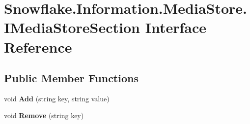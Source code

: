\hypertarget{interface_snowflake_1_1_information_1_1_media_store_1_1_i_media_store_section}{}\section{Snowflake.\+Information.\+Media\+Store.\+I\+Media\+Store\+Section Interface Reference}
\label{interface_snowflake_1_1_information_1_1_media_store_1_1_i_media_store_section}
\subsection*{Public Member Functions}
\begin{DoxyCompactItemize}
\item 
\hypertarget{interface_snowflake_1_1_information_1_1_media_store_1_1_i_media_store_section_af3dc1bd02ecb2d3338f94651480e4b30}{}void {\bfseries Add} (string key, string value)\label{interface_snowflake_1_1_information_1_1_media_store_1_1_i_media_store_section_af3dc1bd02ecb2d3338f94651480e4b30}

\item 
\hypertarget{interface_snowflake_1_1_information_1_1_media_store_1_1_i_media_store_section_aae9c8aa021f6477d289e1d572f7a6aeb}{}void {\bfseries Remove} (string key)\label{interface_snowflake_1_1_information_1_1_media_store_1_1_i_media_store_section_aae9c8aa021f6477d289e1d572f7a6aeb}

\end{DoxyCompactItemize}
